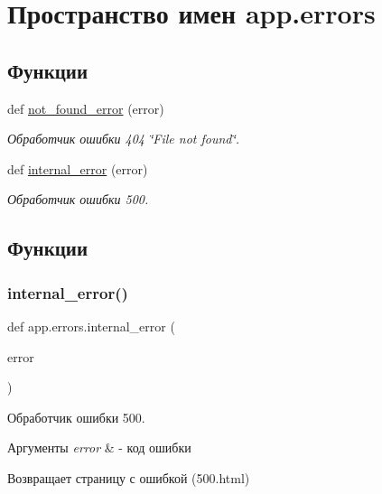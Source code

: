 \hypertarget{namespaceapp_1_1errors}{}\section{Пространство имен app.\+errors}
\label{namespaceapp_1_1errors}
\subsection*{Функции}
\begin{DoxyCompactItemize}
\item 
def \mbox{\hyperlink{namespaceapp_1_1errors_a9194a32acf0c07060c8375e17f202af8}{not\+\_\+found\+\_\+error}} (error)
\begin{DoxyCompactList}\small\item\em Обработчик ошибки 404 \char`\"{}\+File not found\char`\"{}. \end{DoxyCompactList}\item 
def \mbox{\hyperlink{namespaceapp_1_1errors_a080d04aef974075b9be3ed7f6e45d73a}{internal\+\_\+error}} (error)
\begin{DoxyCompactList}\small\item\em Обработчик ошибки 500. \end{DoxyCompactList}\end{DoxyCompactItemize}


\subsection{Функции}
\mbox{\label{namespaceapp_1_1errors_a080d04aef974075b9be3ed7f6e45d73a}} 
\subsubsection{\texorpdfstring{internal\+\_\+error()}{internal\_error()}}
{\footnotesize\ttfamily def app.\+errors.\+internal\+\_\+error (\begin{DoxyParamCaption}\item[{}]{error }\end{DoxyParamCaption})}



Обработчик ошибки 500. 


\begin{DoxyParams}{Аргументы}
{\em error} & -\/ код ошибки \\
\hline
\end{DoxyParams}
\begin{DoxyReturn}{Возвращает}
страницу с ошибкой (500.\+html) 
\end{DoxyReturn}
\mbox{\label{namespaceapp_1_1errors_a9194a32acf0c07060c8375e17f202af8}} 
